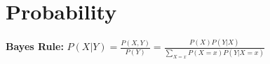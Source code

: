 \begin{comment}
	\pagebreak
\end{comment}

\section{Probability}
\begin{comment}
\textbf{Normalization:} $P(\Omega) = 1$, \textbf{Non-negativity:} $P(A) \geq 0$\\
\textbf{Additivity:} $\forall A_i$ disjoint, $P(\cup_i^\infty A_i) = \sum_i^\infty P(A_i)$\\



\textbf{Independence:} $P(X_1=x_1,..,X_n=x_n) = P(x_1),...,P(x_n)$\\
	Strong requirement, leaves us f.e. in Bayes with $P(X,Y) = P(X)P(Y|X) = P(X)P(Y)$\\

$P(X=x, Y=y | Z=z) = P(X=x | Z=z) P(Y=y | Z=z)$\\

	Dimensionality problem: a probability distribution $P(X_1=x_1,..,X_n = x_n)$ needs $2^n-1$ parameters to be specified.\\
	Marginalizing to one distribution is also huge, its n-1 sums over all values.\\

\textbf{Product Rule:} $P(A,B) = P(A|B)P(B) = P(B|A)P(A)$\\
$P(X_1,..,X_n) = P(X_1)P(X_2|X_1)P(X_3|X_1X_2)..P(X_n|X_1..X_{n-1})$\\

\textbf{Sum rule:} $P(X_{1:{i-1}}, X_{i+1:n}) = \sum_{x_i} P(X_{1:{i-1}}, x_i, X_{i+1:n})$\\
	This is also called marginalization.
	If we have a joint probability distributions with many individual distributions, we can reduce the number of individual distributions by marginalizing out.
	The intuition behind this is based on the law of total probability. If we have two joint distributions. By summing up all outcomes of one of them, we have all events of this distribution covered in the marginalized distribution. This then only depends on the other variables.\\
\end{comment}

\textbf{Bayes Rule:} $P(X|Y) = \frac{P(X,Y)}{P(Y)} = \frac{P(X)P(Y|X)}{\sum_{X=x}P(X=x)P(Y|X=x)}$\\
\begin{comment}
	Given the prior and the likelihood, Bayes rule can be used to calculate the posterior. 
	If we are looking for a probability distribution, we must also calculate the normalizer, by marginalising out all variables except Y, which can be done by knowing prior and likelihood, but can be intractable\\
\end{comment}


